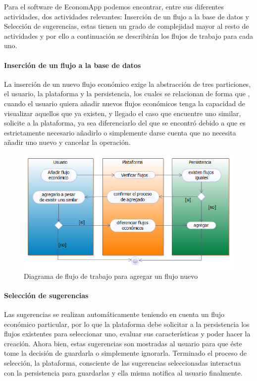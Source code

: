 Para el software de EconomApp podemos encontrar, entre sus diferentes actividades, dos actividades relevantes: Inserción de un flujo a la base de datos y Selección de sugerencias, estas tienen un grado de complejidad mayor al resto de actividades y por ello a continuación se describirán los flujos de trabajo para cada uno.

\paragraph{Inserción de un flujo a la base de datos}

La inserción de un nuevo flujo económico exige la abstracción de tres particiones, el usuario, la plataforma y la persistencia, los cuales se relacionan de forma que , cuando el usuario quiera añadir nuevos flujos económicos tenga la capacidad de visualizar aquellos que ya existen, y llegado el caso que encuentre uno similar, solicite a la plataforma, ya sea diferenciarlo del que se encontró debido a que es estrictamente necesario añadirlo o simplemente darse cuenta que no necesita añadir uno nuevo y cancelar la operación. 

\begin{figure}[H]
	\centering
	\includegraphics[width=1\linewidth]{parte2/imgs/DiagramaDeFlujoDeTrabajo/DiagaramaDeFlujo1}
	\caption{Diagrama de flujo de trabajo para agregar un flujo nuevo}
	\label{fig:workflowAgregarFlujo}
\end{figure}

\paragraph{Selección de sugerencias}
	
Las sugerencias se realizan automáticamente teniendo en cuenta un flujo económico particular, por lo que la plataforma debe solicitar a la persistencia los flujos existentes para seleccionar uno, evaluar sus características y poder hacer la creación. Ahora bien, estas sugerencias son mostradas al usuario para que éste tome la decisión de guardarla o simplemente ignorarla. Terminado el proceso de selección, la plataforma, consciente de las sugerencias seleccionadas interactua con la persistencia para guardarlas y ella misma notifica al usuario finalmente.
	
